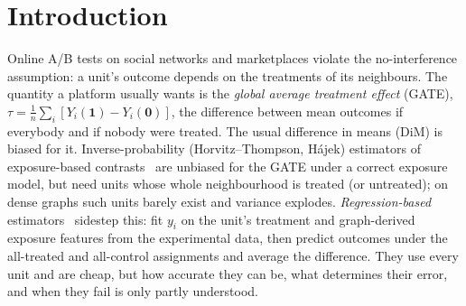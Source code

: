 \section{Introduction}
\label{sec:intro}

Online A/B tests on social networks and marketplaces violate the no-interference assumption: a unit's outcome depends on the treatments of its neighbours. The quantity a platform usually wants is the \emph{global average treatment effect} (GATE), $\tau=\frac1n\sum_i[Y_i(\mathbf 1)-Y_i(\mathbf 0)]$, the difference between mean outcomes if everybody and if nobody were treated. The usual difference in means (DiM) is biased for it. Inverse-probability (Horvitz--Thompson, H\'ajek) estimators of exposure-based contrasts~\citep{aronow2017estimating,ugander2013graph} are unbiased for the GATE under a correct exposure model, but need units whose whole neighbourhood is treated (or untreated); on dense graphs such units barely exist and variance explodes. \emph{Regression-based} estimators~\citep{chin2019regression,han2023model} sidestep this: fit $y_i$ on the unit's treatment and graph-derived exposure features from the experimental data, then predict outcomes under the all-treated and all-control assignments and average the difference. They use every unit and are cheap, but how accurate they can be, what determines their error, and when they fail is only partly understood.

